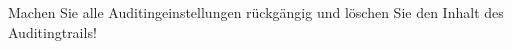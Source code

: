     \item Machen Sie alle Auditingeinstellungen rückgängig und löschen Sie den Inhalt des Auditingtrails!
